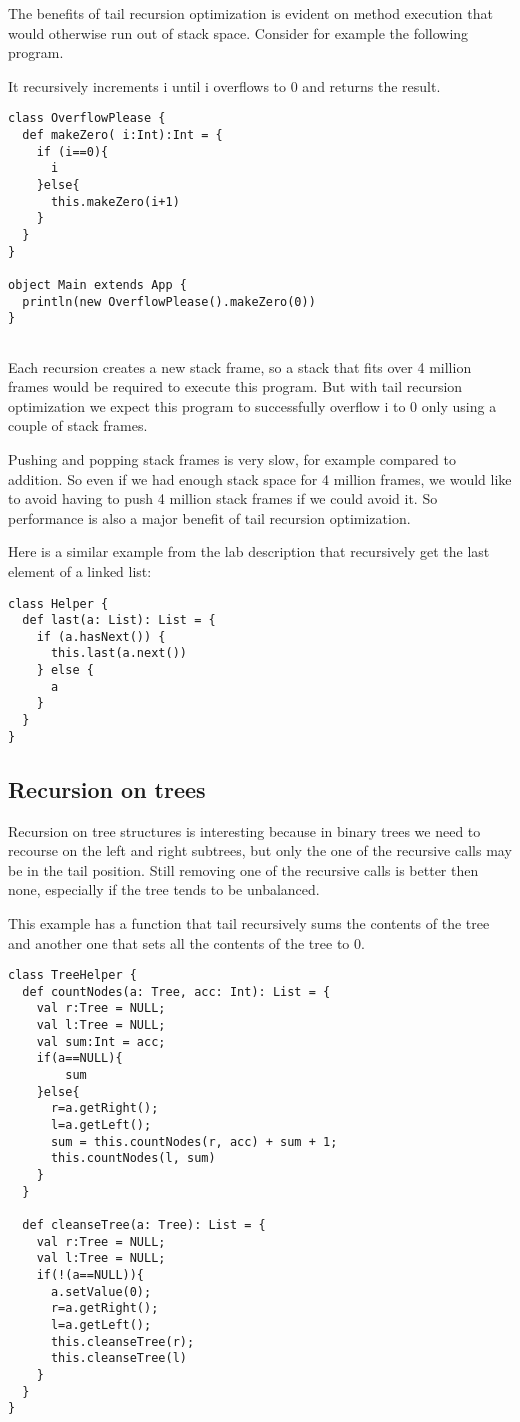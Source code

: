 The benefits of tail recursion optimization is evident on  method execution that would otherwise run out of stack space. Consider for example the following program.

It recursively increments i until i overflows to 0 and returns the result.
\begin{lstlisting}
class OverflowPlease {
  def makeZero( i:Int):Int = {
    if (i==0){
      i
    }else{
      this.makeZero(i+1)
    }
  }
}

object Main extends App {
  println(new OverflowPlease().makeZero(0))
}


\end{lstlisting}

Each recursion creates a new stack frame, so a stack that fits over 4 million frames would be required to execute this program. But with tail recursion optimization we expect this program to successfully overflow i to 0 only using a couple of stack frames.

Pushing and popping stack frames is very slow, for example compared to addition. So even if we had enough stack space for 4 million frames, we would like to avoid having to push 4 million stack frames if we could avoid it. So performance is also a major benefit of tail recursion optimization.


Here is a similar example from the lab description that recursively get the last element of a linked list:

\begin{lstlisting}
class Helper {
  def last(a: List): List = {
    if (a.hasNext()) {
      this.last(a.next())
    } else {
      a
    }
  }
}
\end{lstlisting}

\subsection{Recursion on trees}

Recursion on tree structures is interesting because in binary trees we need to recourse on the left and right subtrees, but only the one of the recursive calls may be in the tail position. Still removing one of the recursive calls is better then none, especially if the tree tends to be unbalanced.

This example has a function that tail recursively sums the contents of the tree and another one that sets all the contents of the tree to 0.

\begin{lstlisting}
class TreeHelper {
  def countNodes(a: Tree, acc: Int): List = {
    val r:Tree = NULL;
    val l:Tree = NULL;
    val sum:Int = acc;
    if(a==NULL){
        sum
    }else{
      r=a.getRight();
      l=a.getLeft();
      sum = this.countNodes(r, acc) + sum + 1;
      this.countNodes(l, sum)
    }
  }
  
  def cleanseTree(a: Tree): List = {
    val r:Tree = NULL;
    val l:Tree = NULL;
    if(!(a==NULL)){
      a.setValue(0);
      r=a.getRight();
      l=a.getLeft();
      this.cleanseTree(r);
      this.cleanseTree(l)
    }
  }
}
\end{lstlisting}

